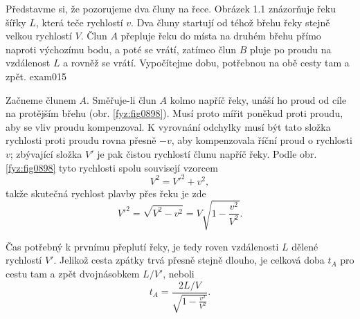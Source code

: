 \begin{fyzexam}{Představme si, že pozorujeme dva čluny na řece. Obrázek 1.1 znázorňuje řeku šířky
  \(L\), která teče rychlostí \(v\). Dva čluny startují od téhož břehu řeky stejně velkou rychlostí
  \(V\). Člun \(A\) přepluje řeku do místa na druhém břehu přímo naproti výchozímu bodu, a poté se
  vrátí, zatímco člun \(B\) pluje po proudu na vzdálenost \(L\) a rovněž se vrátí. Vypočítejme dobu,
  potřebnou na obě cesty tam a zpět. \hfill\cite[s.~18]{Beiser1975}}{exam015} 

  {\centering\captionsetup{type=figure}\par}

  \vspace{1em}
  Začneme člunem \(A\). Směřuje-li člun \(A\) kolmo napříč řeky, unáší ho proud od cíle na protějším
  břehu (obr. \ref{fyz:fig0898}). Musí proto mířit poněkud proti proudu, aby se vliv proudu
  kompenzoval. K vyrovnání odchylky musí být tato složka rychlosti proti proudu rovna přesně \(-v\),
  aby kompenzovala říční proud o rychlosti \(v\); zbývající složka \(V'\) je pak čistou rychlostí
  člunu napříč řeky. Podle obr. \ref{fyz:fig0898} tyto rychlosti spolu souvisejí vzorcem
  \begin{equation*}
    V^2 = V'^2 + v^2,
  \end{equation*}
  takže skutečná rychlost plavby přes řeku je zde
  \begin{equation*}
    V'^2 = \sqrt{V^2 - v^2} = V\sqrt{1 - \frac{v^2}{V^2}}.
  \end{equation*}

  {\centering
  \captionsetup{type=figure}
   \par}
  \vspace{1em}
  Čas potřebný k prvnímu přeplutí řeky, je tedy roven vzdálenosti \(L\) dělené rychlostí \(V'\).
  Jelikož cesta zpátky trvá přesně stejně dlouho, je celková doba \(t_A\) pro cestu tam a zpět
  dvojnásobkem \(L/V'\), neboli 
  \begin{equation*}
    t_A = \frac{2L/V}{\sqrt{1 - \frac{v^2}{V^2}}}.
  \end{equation*}


\end{fyzexam}
